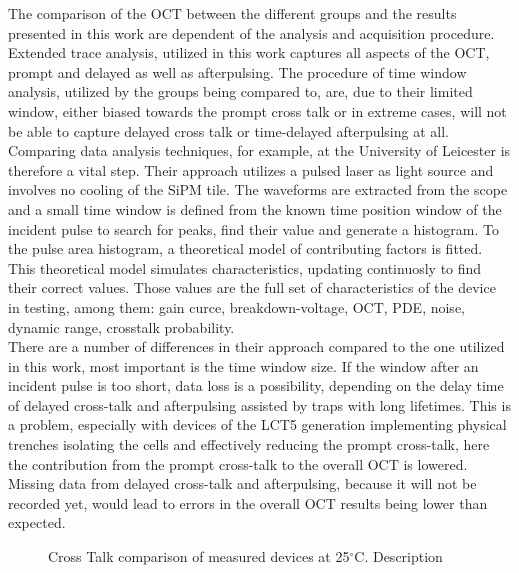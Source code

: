 \documentclass[12pt,article,type=msc,colorback,accentcolor=tud9c]{tudthesis}
\begin{document}
The comparison of the OCT between the different groups and the results presented in this work are dependent of the analysis and acquisition procedure. Extended trace analysis, utilized in this work captures all aspects of the OCT, prompt and delayed as well as afterpulsing. The procedure of time window analysis, utilized by the groups being compared to, are, due to their limited window, either biased towards the prompt cross talk or in extreme cases, will not be able to capture delayed cross talk or time-delayed afterpulsing at all. Comparing data analysis techniques, for example, at the University of Leicester is therefore a vital step. Their approach utilizes a pulsed laser as light source and involves no cooling of the SiPM tile. The waveforms are extracted from the scope and a small time window is defined from the known time position window of the incident pulse to search for peaks, find their value and generate a histogram. To the pulse area histogram, a theoretical model of contributing factors is fitted. This theoretical model simulates characteristics, updating continuosly to find their correct values. Those values are the full set of characteristics of the device in testing, among them: gain curce, breakdown-voltage, OCT, PDE, noise, dynamic range, crosstalk probability.\\
There are a number of differences in their approach compared to the one utilized in this work, most important is the time window size. If the window after an incident pulse is too short, data loss is a possibility, depending on the delay time of delayed cross-talk and afterpulsing assisted by traps with long lifetimes. This is a problem, especially with devices of the LCT5 generation implementing physical trenches isolating the cells and effectively reducing the prompt cross-talk, here the contribution from the prompt cross-talk to the overall OCT is lowered. Missing data from delayed cross-talk and afterpulsing, because it will not be recorded yet, would lead to errors in the overall OCT results being lower than expected.\\


\begin{figure}[h]
\begin{centering}
\caption[OCT device comparison]{Cross Talk comparison of measured devices at 25$^\circ$C. Description}
\label{fig:DC_OCT}
\end{centering}
\end{figure}
\end{document}
